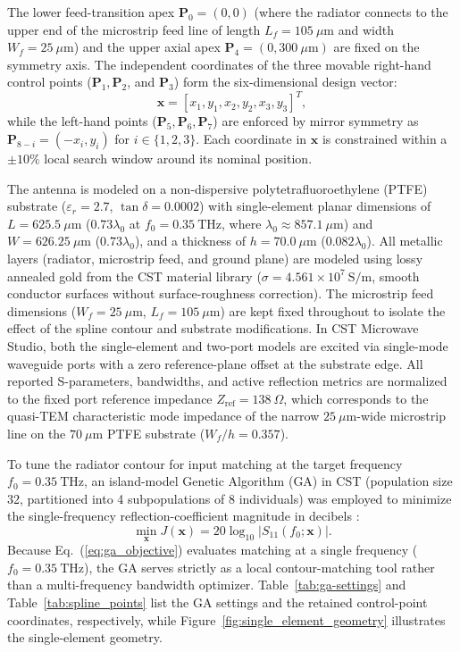 \documentclass[referee,pdflatex,sn-mathphys-ay]{sn-jnl}
\begin{document}
The lower feed-transition apex $\mathbf{P}_0 = (0, 0)$ (where the radiator connects to the upper end of the microstrip feed line of length $L_f = 105~\mu\mathrm{m}$ and width $W_f = 25~\mu\mathrm{m}$) and the upper axial apex $\mathbf{P}_4 = (0, 300~\mu\mathrm{m})$ are fixed on the symmetry axis. The independent coordinates of the three movable right-hand control points ($\mathbf{P}_1, \mathbf{P}_2$, and $\mathbf{P}_3$) form the six-dimensional design vector:
\begin{equation}
\mathbf{x}= \left[ x_1, y_1, x_2, y_2, x_3, y_3 \right]^{T},
\label{eq:design_vector}
\end{equation}
while the left-hand points ($\mathbf{P}_5, \mathbf{P}_6, \mathbf{P}_7$) are enforced by mirror symmetry as $\mathbf{P}_{8-i}=(-x_i,y_i)$ for $i\in\{1,2,3\}$. Each coordinate in $\mathbf{x}$ is constrained within a $\pm10\%$ local search window around its nominal position.

The antenna is modeled on a non-dispersive polytetrafluoroethylene (PTFE) substrate ($\varepsilon_r = 2.7$, $\tan \delta = 0.0002$) with single-element planar dimensions of $L = 625.5~\mu\mathrm{m}$ ($0.73\lambda_0$ at $f_0 = 0.35~\mathrm{THz}$, where $\lambda_0 \approx 857.1~\mu\mathrm{m}$) and $W = 626.25~\mu\mathrm{m}$ ($0.73\lambda_0$), and a thickness of $h = 70.0~\mu\mathrm{m}$ ($0.082\lambda_0$). All metallic layers (radiator, microstrip feed, and ground plane) are modeled using lossy annealed gold from the CST material library ($\sigma = 4.561 \times 10^{7}~\mathrm{S/m}$, smooth conductor surfaces without surface-roughness correction). The microstrip feed dimensions ($W_f = 25~\mu\mathrm{m}$, $L_f = 105~\mu\mathrm{m}$) are kept fixed throughout to isolate the effect of the spline contour and substrate modifications. In CST Microwave Studio, both the single-element and two-port models are excited via single-mode waveguide ports with a zero reference-plane offset at the substrate edge. All reported S-parameters, bandwidths, and active reflection metrics are normalized to the fixed port reference impedance $Z_{\mathrm{ref}}=138~\Omega$, which corresponds to the quasi-TEM characteristic mode impedance of the narrow $25~\mu\mathrm{m}$-wide microstrip line on the $70~\mu\mathrm{m}$ PTFE substrate ($W_f/h = 0.357$).

To tune the radiator contour for input matching at the target frequency $f_0 = 0.35~\mathrm{THz}$, an island-model Genetic Algorithm (GA) in CST (population size 32, partitioned into 4 subpopulations of 8 individuals) was employed to minimize the single-frequency reflection-coefficient magnitude in decibels \citep{Goudos2016}:
\begin{equation}
\min_{\mathbf{x}} J(\mathbf{x}) = 20\log_{10}\left|S_{11}(f_0;\mathbf{x})\right|.
\label{eq:ga_objective}
\end{equation}
Because Eq.~(\ref{eq:ga_objective}) evaluates matching at a single frequency ($f_0 = 0.35~\mathrm{THz}$), the GA serves strictly as a local contour-matching tool rather than a multi-frequency bandwidth optimizer. Table~\ref{tab:ga-settings} and Table~\ref{tab:spline_points} list the GA settings and the retained control-point coordinates, respectively, while Figure~\ref{fig:single_element_geometry} illustrates the single-element geometry.
\end{document}
